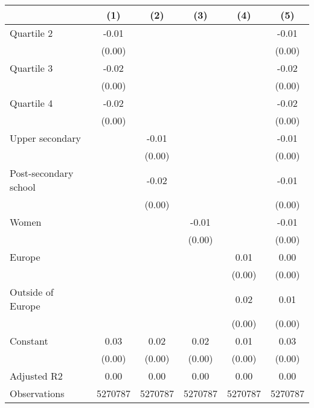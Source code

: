 
\begin{tabular}{@{}l*{5}{S[table-format={-}2.2{\tnote{***}}]}@{}}
\toprule
{} & {(1)} & {(2)} & {(3)} & {(4)} & {(5)}\tabularnewline%
\midrule
Quartile 2 & -0.01\tnote{***} &  &  &  & -0.01\tnote{***}\tabularnewline%
 & (0.00) &  &  &  & \vphantom{2} (0.00)\tabularnewline%
Quartile 3 & -0.02\tnote{***} &  &  &  & -0.02\tnote{***}\tabularnewline%
 & (0.00) &  &  &  & \vphantom{1} (0.00)\tabularnewline%
Quartile 4 & -0.02\tnote{***} &  &  &  & -0.02\tnote{***}\tabularnewline%
 & (0.00) &  &  &  & (0.00)\tabularnewline%
Upper secondary &  & -0.01\tnote{***} &  &  & -0.01\tnote{*}\tabularnewline%
 &  & (0.00) &  &  & \vphantom{1} (0.00)\tabularnewline%
Post-secondary school &  & -0.02\tnote{***} &  &  & -0.01\tnote{***}\tabularnewline%
 &  & (0.00) &  &  & (0.00)\tabularnewline%
Women &  &  & -0.01\tnote{***} &  & -0.01\tnote{***}\tabularnewline%
 &  &  & (0.00) &  & (0.00)\tabularnewline%
Europe &  &  &  & 0.01\tnote{**} & 0.00\tabularnewline%
 &  &  &  & (0.00) & \vphantom{1} (0.00)\tabularnewline%
Outside of Europe &  &  &  & 0.02\tnote{***} & 0.01\tnote{***}\tabularnewline%
 &  &  &  & (0.00) & (0.00)\tabularnewline%
Constant & 0.03\tnote{***} & 0.02\tnote{***} & 0.02\tnote{***} & 0.01\tnote{***} & 0.03\tnote{***}\tabularnewline%
 & (0.00) & (0.00) & (0.00) & (0.00) & (0.00)\tabularnewline%
\midrule
Adjusted R2 & 0.00 & 0.00 & 0.00 & 0.00 & 0.00\tabularnewline%
Observations & {\num{5270787}} & {\num{5270787}} & {\num{5270787}} & {\num{5270787}} & {\num{5270787}}\tabularnewline%
\bottomrule
\end{tabular}
